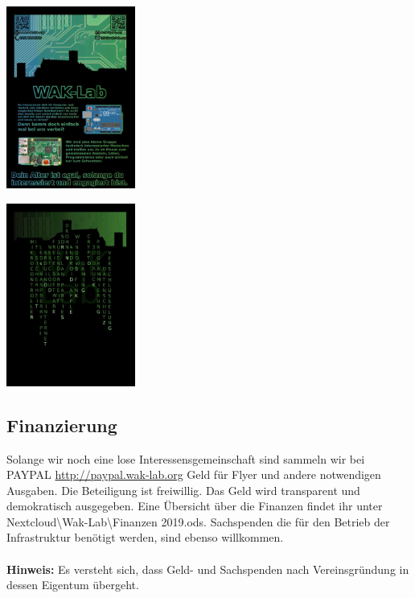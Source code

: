 \ \\
\begin{minipage}[t]{0.5\textwidth}
  \centering
  \includegraphics[height=6cm]{pictures/FlyerMitPlatine.jpg}
  \label{img:FlyerMitPlatine}
\end{minipage}
\begin{minipage}[t]{0.5\textwidth}
  \centering
  \includegraphics[height=6cm]{pictures/FlyerRueckseite.jpg}
  \label{img:FlyerRueckseite}
\end{minipage}

\subsection{Finanzierung}
Solange wir noch eine lose Interessensgemeinschaft sind sammeln wir bei PAYPAL \url{http://paypal.wak-lab.org} Geld für Flyer und andere notwendigen Ausgaben. Die Beteiligung ist freiwillig. Das Geld wird transparent und demokratisch ausgegeben. Eine Übersicht über die Finanzen findet ihr unter Nextcloud\textbackslash Wak-Lab\textbackslash Finanzen 2019.ods. Sachspenden die für den Betrieb der Infrastruktur benötigt werden, sind ebenso willkommen. \\
\ \\
\textbf{Hinweis:} Es versteht sich, dass Geld- und Sachspenden nach Vereinsgründung in dessen Eigentum übergeht.\\

